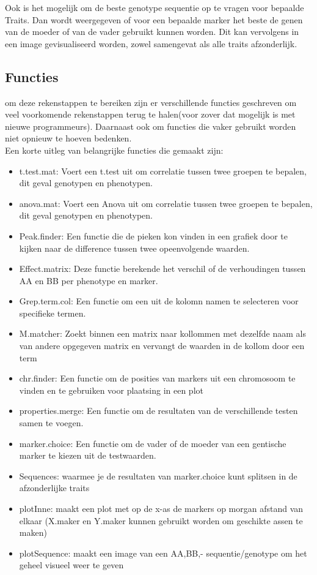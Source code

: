 \documentclass[12pt,a4paper]{article}
\begin{document}
Ook is het mogelijk om de beste genotype sequentie op te vragen voor bepaalde Traits.
Dan wordt weergegeven of voor een bepaalde marker het beste de genen van de moeder of van de vader gebruikt kunnen worden.
Dit kan vervolgens  in een image gevisualiseerd worden, zowel samengevat als alle traits afzonderlijk.
\pagebreak
\subsection*{Functies}
om deze rekenstappen te bereiken zijn er verschillende functies geschreven om veel voorkomende rekenstappen terug te halen(voor zover dat mogelijk is met nieuwe programmeurs).
Daarnaast ook om functies die vaker gebruikt worden niet opnieuw te hoeven bedenken.\\

Een korte uitleg van belangrijke functies die gemaakt zijn:
\begin{itemize}
\item t.test.mat: Voert een t.test uit om correlatie tussen twee groepen te bepalen, dit geval genotypen en phenotypen.
\item anova.mat: Voert een Anova uit om correlatie tussen twee groepen te bepalen, dit geval genotypen en phenotypen.
\item Peak.finder: Een functie die de pieken kon vinden in een grafiek door te kijken naar de difference tussen twee opeenvolgende waarden.
\item Effect.matrix: Deze functie berekende het verschil of de verhoudingen tussen AA en BB per phenotype en marker.
\item Grep.term.col: Een functie om een uit de kolomn namen te selecteren voor specifieke termen.
\item M.matcher: Zoekt binnen een matrix naar kollommen met dezelfde naam als van andere opgegeven matrix en vervangt de waarden in de kollom door een term
\item chr.finder: Een functie om de posities van markers uit een chromosoom te vinden en te gebruiken voor plaatsing in een plot
\item properties.merge: Een functie om de resultaten van de verschillende testen samen te voegen.
\item marker.choice: Een functie om de vader of de moeder van een gentische marker te kiezen uit de testwaarden.
\item Sequences: waarmee je de resultaten van marker.choice kunt splitsen in de afzonderlijke traits
\item plotInne: maakt een plot met op de x-as de markers op morgan afstand van elkaar (X.maker en Y.maker kunnen gebruikt worden om geschikte assen te maken)
\item plotSequence: maakt een image van een AA,BB,- sequentie/genotype om het geheel visueel weer te geven
\end{itemize}
\end{document}
